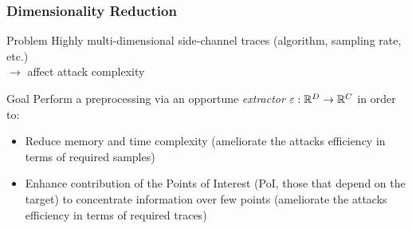 %
%
%
%
%
%




\begin{frame}
\frametitle{Dimensionality Reduction}

\begin{block}{Problem}
Highly multi-dimensional side-channel traces (algorithm, sampling rate, etc.)\\
$\longrightarrow$ affect attack complexity
\end{block}

\begin{block}{Goal}
Perform a preprocessing via an opportune \emph{extractor} $\varepsilon:\mathbb{R}^D\rightarrow \mathbb{R}^C$ in order to:
\begin{itemize}
\item Reduce memory and time complexity (ameliorate the attacks efficiency in terms of required samples)
\item Enhance contribution of the Points of Interest (PoI, those that depend on the target) to concentrate information over few points (ameliorate the attacks efficiency in terms of required traces)
\end{itemize}
\end{block}



\end{frame}

